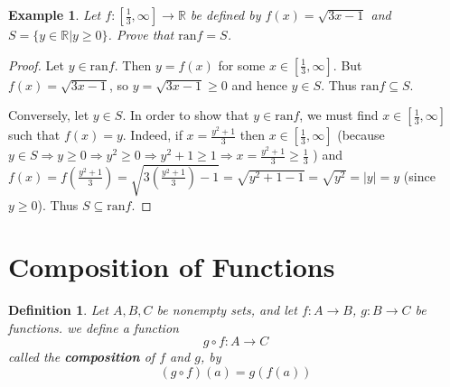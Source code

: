 \documentclass[10pt,reqno]{book}
\theoremstyle{plain}
\newtheorem{definition}[theorem]{Definition}
\newtheorem{example}{Example}
\def\R{\mathbb{R}}
\def\ran{\text{ran}}
\begin{document}
	\begin{center}
	\end{center}
	
	\begin{example}
		Let $ f: [\frac{1}{3}, \infty] \to \R $ be defined by $ f(x) = \sqrt{3x-1} $ and $ S = \{ y \in \R | y \geq 0 \} $. Prove that $ \ran f = S $.
	\end{example}

	\begin{proof}
		Let $ y \in \ran f $. Then $ y = f(x) $ for some $ x \in [\frac{1}{3}, \infty] $. But $ f(x) = \sqrt{3x-1} $, so $ y = \sqrt{3x-1} \geq 0 $ and hence $ y \in S $. Thus $ \ran f \subseteq S $.
		
		\noindent Conversely, let $ y \in S $. In order to show that $ y \in \ran f $, we must find $ x \in [\frac{1}{3}, \infty] $ such that $ f(x) = y $. Indeed, if $ x = \frac{y^2 + 1}{3} $ then $ x \in [\frac{1}{3}, \infty] $ (because $ y \in S \Rightarrow y \geq 0 \Rightarrow y^2 \geq 0 \Rightarrow y^2+1 \geq 1 \Rightarrow x = \frac{y^2+1}{3} \geq \frac{1}{3} $ ) and $ f(x) = f(\frac{y^2+1}{3}) = \sqrt{3\left( \frac{y^2+1}{3} \right) - 1} = \sqrt{y^2+1-1} = \sqrt{y^2} = |y| = y $ (since $ y \geq 0 $). Thus $ S \subseteq \ran f $.
	\end{proof}
	
	
	
	
	\section{Composition of Functions}
	
	\begin{definition}
		Let $ A,B,C $ be nonempty sets, and let $ f:A \to B $, $ g: B \to C $ be functions. we define a function
		\[ g \circ f: A \to C \]
		called the \textbf{composition} of $ f $ and $ g $, by
		\[ (g \circ f)(a) = g(f(a)) \]
	\end{definition}
\end{document}
